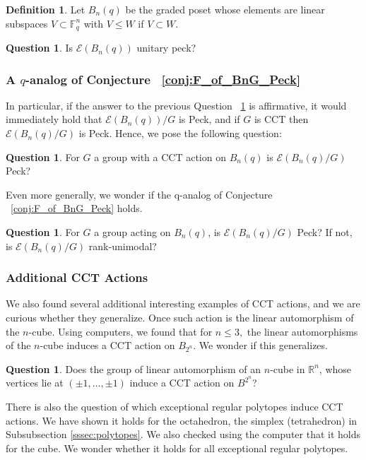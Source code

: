 \documentclass[10 pt]{amsart}
\theoremstyle{plain}
\theoremstyle{definition}
\newtheorem{defn}[thm]{Definition}
\newtheorem{question}[thm]{Question}
\theoremstyle{remark}
\numberwithin{equation}{section}
\newcommand\sssec{\subsubsection}
\begin{document}
\begin{defn}
Let $B_n(q)$ be the graded poset whose elements are linear subspaces $V \subset \mathbb F_q^n$ with $V \leq W$ if $V \subset W.$
\end{defn}

\begin{question}
\label{question:unitary_peck_q_edge}
Is $\mathcal E(B_n(q))$ unitary peck?
\end{question}

\sssec{A $q$-analog of Conjecture ~\ref{conj:F_of_BnG_Peck}}

In particular, if the answer to the previous Question ~\ref{question:unitary_peck_q_edge} is affirmative, it would immediately hold that $\mathcal E(B_n(q))/G$ is Peck, and if $G$ is CCT then $\mathcal E(B_n(q)/G)$ is Peck. Hence, we pose the following question: 

\begin{question}
For $G$ a group with a CCT action on $B_n(q)$ is $\mathcal E(B_n(q)/G)$ Peck?
\end{question}

Even more generally, we wonder if the q-analog of Conjecture ~\ref{conj:F_of_BnG_Peck} holds.

\begin{question}
For $G$ a group acting on $B_n(q)$, is $\mathcal E(B_n(q)/G)$ Peck? If not, is $\mathcal E(B_n(q)/G)$ rank-unimodal?
\end{question}

\sssec{Additional CCT Actions}

We also found several additional interesting examples of CCT actions, and we are curious whether they generalize. Once such action is the linear automorphism of the $n$-cube. Using computers, we found that for $n \leq 3,$ the linear automorphisms of the $n$-cube induces a CCT action on $B_{2^n}$. We wonder if this generalizes.

\begin{question}
\label{question:cube_cct}
Does the group of linear automorphism of an $n$-cube in $\mathbb R^n$, whose vertices lie at $(\pm 1, \ldots, \pm 1)$ induce a CCT action on $B^{2^n}$?
\end{question}

There is also the question of which exceptional regular polytopes induce CCT actions. We have shown it holds for the octahedron, the simplex (tetrahedron) in Subsubsection \ref{sssec:polytopes}. We also checked using the computer that it holds for the cube. We wonder whether it holds for all exceptional regular polytopes.
\end{document}
